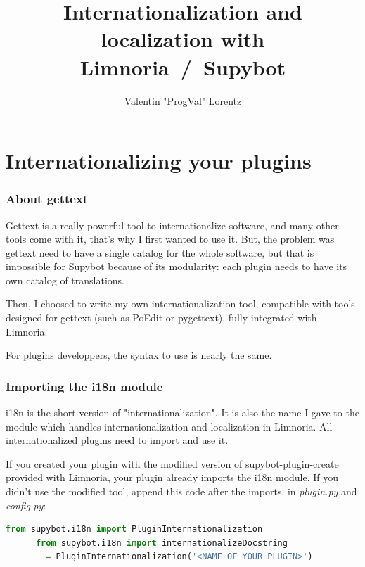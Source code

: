 \documentclass[a4paper,11pt]{article}
\title{Internationalization and localization with Limnoria~/~Supybot}
\author{Valentin "ProgVal" Lorentz}
\date{}
\begin{document}
\maketitle
\tableofcontents

\newpage

\part{Internationalizing your plugins}
  \section{About gettext}

    Gettext is a really powerful tool to internationalize software, and many
    other tools come with it, that's why I first wanted to use it.
    But, the problem was gettext need to have a single catalog for the whole
    software, but that is impossible for Supybot because of its modularity:
    each plugin needs to have its own catalog of translations.

    Then, I choosed to write my own internationalization tool, compatible with
    tools designed for gettext (such as PoEdit or pygettext), fully integrated
    with Limnoria.
    
    For plugins developpers, the syntax to use is nearly the same.
    
  \section{Importing the i18n module}
    
    i18n is the short version of "internationalization". It is also the name
    I gave to the module which handles internationalization and localization
    in Limnoria. All internationalized plugins need to import and use it.
    
    If you created your plugin with the modified version of
    supybot-plugin-create provided with Limnoria, your plugin already imports
    the i18n module. If you didn't use the modified tool, append this code
    after the imports, in \emph{plugin.py} and \emph{config.py}:
    \begin{lstlisting}[language=python]
      from supybot.i18n import PluginInternationalization
      from supybot.i18n import internationalizeDocstring
      _ = PluginInternationalization('<NAME OF YOUR PLUGIN>')
    \end{lstlisting}
    
\end{document}
